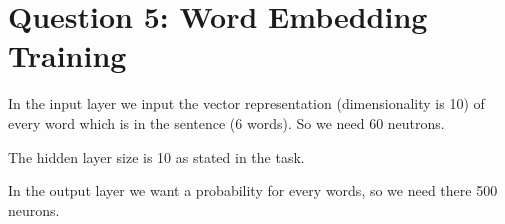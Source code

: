 \documentclass{article}
\begin{document}
	\section*{Question 5: Word Embedding Training}
	In the input layer we input the vector representation (dimensionality is 10) of every word which is in the sentence (6 words). So we need 60 neutrons.
	
	The hidden layer size is 10 as stated in the task.
	
	In the output layer we want a probability for every words, so we need there 500 neurons.
	
\end{document}
